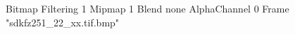 {Bitmap
	{Filtering 1}
	{Mipmap 1}
	{Blend none}
	{AlphaChannel 0}
	{Frame "sdkfz251_22_xx.tif.bmp"}
}
